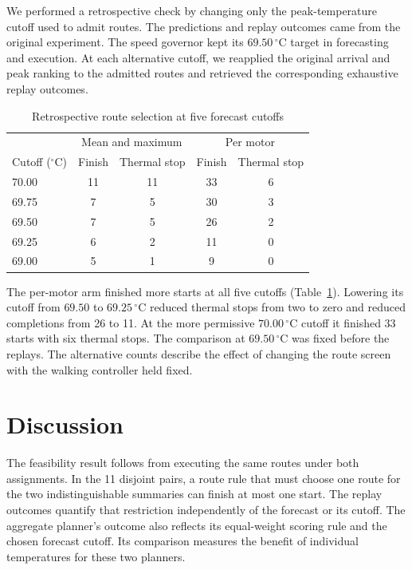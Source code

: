 \documentclass{ieeeaccess}
\begin{document}
We performed a retrospective check by changing only the peak-temperature cutoff used to admit routes. The predictions and replay outcomes came from the original experiment. The speed governor kept its $69.50\,{}^\circ\mathrm{C}$ target in forecasting and execution. At each alternative cutoff, we reapplied the original arrival and peak ranking to the admitted routes and retrieved the corresponding exhaustive replay outcomes.

\begin{table}[!t]
\caption{Retrospective route selection at five forecast cutoffs}
\label{tab:sensitivity}
\centering
\footnotesize
\setlength{\tabcolsep}{3pt}
\renewcommand{\arraystretch}{1.14}
\begin{tabular}{@{}lcccc@{}}
\hline
& \multicolumn{2}{c}{Mean and maximum} & \multicolumn{2}{c}{Per motor} \\
\shortstack{Cutoff\\(\ensuremath{{}^\circ\mathrm{C}})} & Finish & Thermal stop & Finish & Thermal stop \\
\hline
70.00 & 11 & 11 & 33 & 6 \\
69.75 & 7 & 5 & 30 & 3 \\
69.50 & 7 & 5 & 26 & 2 \\
69.25 & 6 & 2 & 11 & 0 \\
69.00 & 5 & 1 & 9 & 0 \\
\hline
\end{tabular}
\end{table}

The per-motor arm finished more starts at all five cutoffs (Table~\ref{tab:sensitivity}). Lowering its cutoff from $69.50$ to $69.25\,{}^\circ\mathrm{C}$ reduced thermal stops from two to zero and reduced completions from 26 to 11. At the more permissive $70.00\,{}^\circ\mathrm{C}$ cutoff it finished 33 starts with six thermal stops. The comparison at $69.50\,{}^\circ\mathrm{C}$ was fixed before the replays. The alternative counts describe the effect of changing the route screen with the walking controller held fixed.

\section{Discussion}

The feasibility result follows from executing the same routes under both assignments. In the 11 disjoint pairs, a route rule that must choose one route for the two indistinguishable summaries can finish at most one start. The replay outcomes quantify that restriction independently of the forecast or its cutoff. The aggregate planner's outcome also reflects its equal-weight scoring rule and the chosen forecast cutoff. Its comparison measures the benefit of individual temperatures for these two planners.
\end{document}
